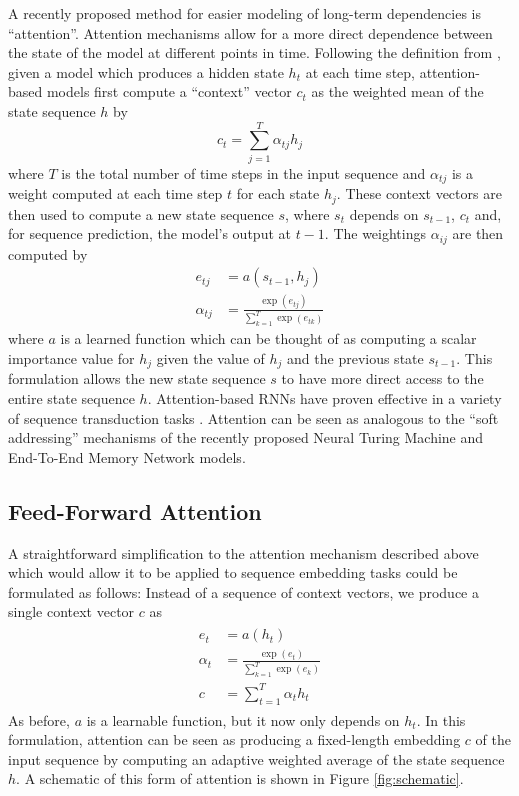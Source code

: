 \documentclass{article} %
\begin{document}
A recently proposed method for easier modeling of long-term dependencies is ``attention''.
Attention mechanisms allow for a more direct dependence between the state of the model at different points in time.
Following the definition from \cite{bahdanau2014neural}, given a model which produces a hidden state $h_t$ at each time step, attention-based models first compute a ``context'' vector $c_t$ as the weighted mean of the state sequence $h$ by
$$
c_t = \sum_{j = 1}^T \alpha_{tj} h_j
$$
where $T$ is the total number of time steps in the input sequence and $\alpha_{tj}$ is a weight computed at each time step $t$ for each state $h_j$.
These context vectors are then used to compute a new state sequence $s$, where $s_t$ depends on $s_{t - 1}$, $c_t$ and, for sequence prediction, the model's output at $t - 1$.
The weightings $\alpha_{ij}$ are then computed by
\begin{align*}
e_{tj} &= a(s_{t - 1}, h_j)\\
\alpha_{tj} &= \frac{\exp(e_{tj})}{\sum_{k = 1}^T \exp(e_{tk})}
\end{align*}
where $a$ is a learned function which can be thought of as computing a scalar importance value for $h_j$ given the value of $h_j$ and the previous state $s_{t - 1}$.
This formulation allows the new state sequence $s$ to have more direct access to the entire state sequence $h$.
Attention-based RNNs have proven effective in a variety of sequence transduction tasks \cite{bahdanau2014neural,cho2015describing}.
Attention can be seen as analogous to the ``soft addressing'' mechanisms of the recently proposed Neural Turing Machine \cite{graves2014neural} and End-To-End Memory Network \cite{sukhbaatar2015end} models.

\subsection{Feed-Forward Attention}

A straightforward simplification to the attention mechanism described above which would allow it to be applied to sequence embedding tasks could be formulated as follows:
Instead of a sequence of context vectors, we produce a single context vector $c$ as
\begin{align}
\begin{split}
\label{eq:ffattention}
e_t &= a(h_t)\\
\alpha_t &= \frac{\exp(e_t)}{\sum_{k = 1}^T \exp(e_k)}\\
c &= \sum_{t = 1}^T \alpha_t h_t
\end{split}
\end{align}
As before, $a$ is a learnable function, but it now only depends on $h_t$.
In this formulation, attention can be seen as producing a fixed-length embedding $c$ of the input sequence by computing an adaptive weighted average of the state sequence $h$.  A schematic of this form of attention is shown in Figure \ref{fig:schematic}.
\end{document}
